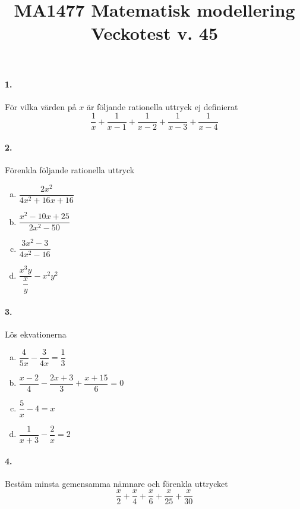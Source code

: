 \documentclass[a4paper]{article}
\title{\bf MA1477 Matematisk modellering \\[10pt]  Veckotest v.
  45}
\date{}
\begin{document}
\maketitle

\paragraph{1.} För vilka värden på $x$ är följande rationella uttryck
ej definierat
\[
\dfrac{1}{x} + \dfrac{1}{x-1} + \dfrac{1}{x-2} + \dfrac{1}{x-3} + \dfrac{1}{x-4}
\]

\paragraph{2.} Förenkla följande rationella uttryck
\begin{enumerate}[(a)]
\item $\dfrac{2x^2}{4x^2 + 16x +16}$
\item $\dfrac{x^2-10x+25}{2x^2-50}$
\item $\dfrac{3x^2-3}{4x^2 -16}$
\item $\dfrac{x^3y}{\dfrac{x}{y}} - x^2y^2$

\end{enumerate}
\paragraph{3.} Lös ekvationerna
\begin{enumerate}[(a)]
\item $\dfrac{4}{5x} - \dfrac{3}{4x} = \dfrac{1}{3}$
\item $\dfrac{x-2}{4} - \dfrac{2x+3}{3} + \dfrac{x+15}{6} = 0$
\item $\dfrac{5}{x} - 4 = x$
\item $\dfrac{1}{x+3} - \dfrac{2}{x} = 2$
\end{enumerate}
\paragraph{4.} Bestäm minsta gemensamma nämnare och förenkla uttrycket
\[
\frac{x}{2} +\frac{x}{4}+\frac{x}{6}+\frac{x}{25}+\frac{x}{30}
\]
\end{document}
